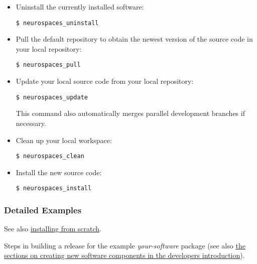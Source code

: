 \documentclass[12pt]{article}
\begin{document}
\begin{itemize}
\item Uninstall the currently installed software:
\begin{verbatim}
$ neurospaces_uninstall
\end{verbatim}

\item Pull the default repository to obtain the newest version of the
  source code in your local repository:
\begin{verbatim}
$ neurospaces_pull
\end{verbatim}

\item Update your local source code from your local repository:
\begin{verbatim}
$ neurospaces_update
\end{verbatim}
  This command also automatically merges parallel development branches
  if necessary.

\item Clean up your local workspace:
\begin{verbatim}
$ neurospaces_clean
\end{verbatim}

\item Install the new source code:
\begin{verbatim}
$ neurospaces_install
\end{verbatim}
\end{itemize}


\subsubsection*{Detailed Examples}

See also
\href{../installation-developer/installation-developer.tex}{installing
  from scratch}.

Steps in building a release for the example {\it your-software}
package (see also \href{../developers-intro/developers-intro.tex}{the
  sections on creating new software components in the developers
  introduction}).
\end{document}
